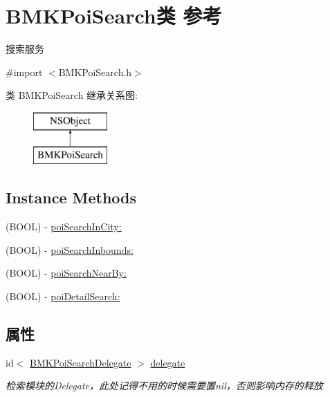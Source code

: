 \hypertarget{interface_b_m_k_poi_search}{}\section{B\+M\+K\+Poi\+Search类 参考}
\label{interface_b_m_k_poi_search}


搜索服务  




{\ttfamily \#import $<$B\+M\+K\+Poi\+Search.\+h$>$}

类 B\+M\+K\+Poi\+Search 继承关系图\+:\begin{figure}[H]
\begin{center}
\leavevmode
\includegraphics[height=2.000000cm]{interface_b_m_k_poi_search}
\end{center}
\end{figure}
\subsection*{Instance Methods}
\begin{DoxyCompactItemize}
\item 
(B\+O\+O\+L) -\/ \hyperlink{interface_b_m_k_poi_search_afd3f3ed4e5193e71ec0efada3172991e}{poi\+Search\+In\+City\+:}
\item 
(B\+O\+O\+L) -\/ \hyperlink{interface_b_m_k_poi_search_a6da39f1518d0dba9df8c31a1fd90b44f}{poi\+Search\+Inbounds\+:}
\item 
(B\+O\+O\+L) -\/ \hyperlink{interface_b_m_k_poi_search_a7abe377e0a0609058d5db2236b33aff1}{poi\+Search\+Near\+By\+:}
\item 
(B\+O\+O\+L) -\/ \hyperlink{interface_b_m_k_poi_search_aae3c3917b12d0212a78a90d4206b8e17}{poi\+Detail\+Search\+:}
\end{DoxyCompactItemize}
\subsection*{属性}
\begin{DoxyCompactItemize}
\item 
\hypertarget{interface_b_m_k_poi_search_a5cf63a1ba785de9592b81ba28acf90e4}{}id$<$ \hyperlink{protocol_b_m_k_poi_search_delegate-p}{B\+M\+K\+Poi\+Search\+Delegate} $>$ \hyperlink{interface_b_m_k_poi_search_a5cf63a1ba785de9592b81ba28acf90e4}{delegate}\label{interface_b_m_k_poi_search_a5cf63a1ba785de9592b81ba28acf90e4}

\begin{DoxyCompactList}\small\item\em 检索模块的\+Delegate，此处记得不用的时候需要置nil，否则影响内存的释放 \end{DoxyCompactList}\end{DoxyCompactItemize}


